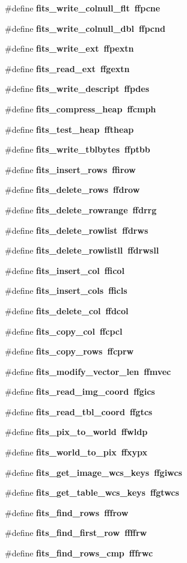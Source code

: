 \begin{CompactItemize}
\#define \bf{fits\_\-write\_\-colnull\_\-flt}~ffpcne
\item 
\#define \bf{fits\_\-write\_\-colnull\_\-dbl}~ffpcnd
\item 
\#define \bf{fits\_\-write\_\-ext}~ffpextn
\item 
\#define \bf{fits\_\-read\_\-ext}~ffgextn
\item 
\#define \bf{fits\_\-write\_\-descript}~ffpdes
\item 
\#define \bf{fits\_\-compress\_\-heap}~ffcmph
\item 
\#define \bf{fits\_\-test\_\-heap}~fftheap
\item 
\#define \bf{fits\_\-write\_\-tblbytes}~ffptbb
\item 
\#define \bf{fits\_\-insert\_\-rows}~ffirow
\item 
\#define \bf{fits\_\-delete\_\-rows}~ffdrow
\item 
\#define \bf{fits\_\-delete\_\-rowrange}~ffdrrg
\item 
\#define \bf{fits\_\-delete\_\-rowlist}~ffdrws
\item 
\#define \bf{fits\_\-delete\_\-rowlistll}~ffdrwsll
\item 
\#define \bf{fits\_\-insert\_\-col}~fficol
\item 
\#define \bf{fits\_\-insert\_\-cols}~fficls
\item 
\#define \bf{fits\_\-delete\_\-col}~ffdcol
\item 
\#define \bf{fits\_\-copy\_\-col}~ffcpcl
\item 
\#define \bf{fits\_\-copy\_\-rows}~ffcprw
\item 
\#define \bf{fits\_\-modify\_\-vector\_\-len}~ffmvec
\item 
\#define \bf{fits\_\-read\_\-img\_\-coord}~ffgics
\item 
\#define \bf{fits\_\-read\_\-tbl\_\-coord}~ffgtcs
\item 
\#define \bf{fits\_\-pix\_\-to\_\-world}~ffwldp
\item 
\#define \bf{fits\_\-world\_\-to\_\-pix}~ffxypx
\item 
\#define \bf{fits\_\-get\_\-image\_\-wcs\_\-keys}~ffgiwcs
\item 
\#define \bf{fits\_\-get\_\-table\_\-wcs\_\-keys}~ffgtwcs
\item 
\#define \bf{fits\_\-find\_\-rows}~fffrow
\item 
\#define \bf{fits\_\-find\_\-first\_\-row}~ffffrw
\item 
\#define \bf{fits\_\-find\_\-rows\_\-cmp}~fffrwc
\item 

\end{CompactItemize}
